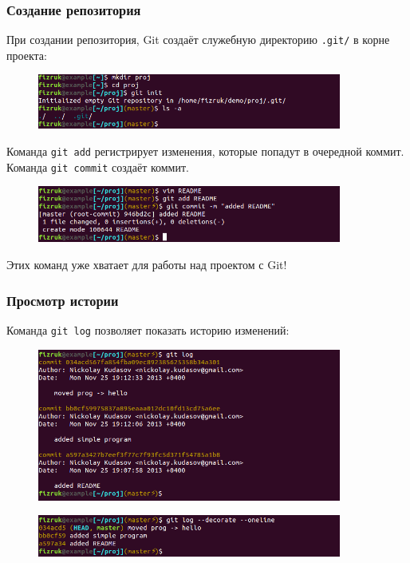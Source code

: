 \documentclass{beamer}
\begin{document}
\begin{frame}
  \frametitle{Создание репозитория}
  При создании репозитория, Git создаёт служебную директорию \texttt{.git/}
  в корне проекта:
  \begin{figure}
     \includegraphics[width=10cm]{images/git-init.png}
  \end{figure}

  Команда \texttt{git add} регистрирует изменения, которые попадут в очередной коммит.
  Команда \texttt{git commit} создаёт коммит.

  \begin{figure}
     \includegraphics[width=10cm]{images/git-add-commit.png}
  \end{figure}

  Этих команд уже хватает для работы над проектом с Git!
\end{frame}

\begin{frame}
  \frametitle{Просмотр истории}
  Команда \texttt{git log} позволяет показать историю изменений:

  \begin{figure}
     \includegraphics[width=10cm]{images/git-log.png}
  \end{figure}

  \begin{figure}
     \includegraphics[width=10cm]{images/git-log-oneline-decorate.png}
  \end{figure}
\end{frame}
\end{document}

